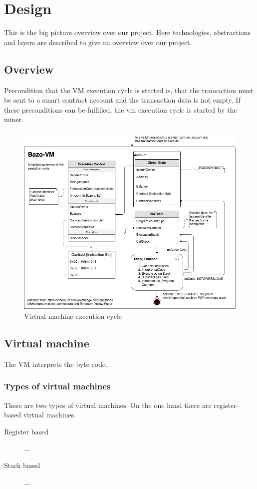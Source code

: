 \chapter{Design}
\thispagestyle{main} %
This is the big picture overview over our project. Here technologies, abstractions and layers are described to give an overview over our project.

\section{Overview}
Precondition that the VM execution cycle is started is, that the transaction must be sent to a smart contract account and the transaction data is not empty. If these preconditions can be fulfilled, the vm execution cycle is started by the miner.

\begin{figure}[H]
	\begin{center}
	\includegraphics[width=\textwidth]{./images/execution-cycle}
	\caption{Virtual machine execution cycle}
	\label{vmexecutioncycle}
	\end{center}
\end{figure}

\section{Virtual machine}
The VM interprets the byte code. 

\subsection{Types of virtual machines}
There are two types of virtual machines. On the one hand there are register-based virtual machines.
\begin{description}
  \item[Register based] ...
  \item[Stack based] ...
\end{description}

